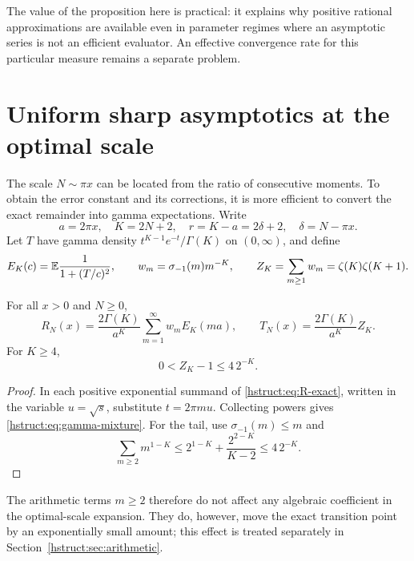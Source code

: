 The value of the proposition here is practical: it explains why
positive rational approximations are available even in parameter
regimes where an asymptotic series is not an efficient evaluator.
An effective convergence rate for this particular measure remains
a separate problem.

\section{Uniform sharp asymptotics at the optimal scale}
\label{hstruct:sec:sharp}

The scale $N\sim\pi x$ can be located from the ratio of consecutive
moments. To obtain the error constant and its corrections, it is
more efficient to convert the exact remainder into gamma expectations.
Write
\begin{equation}\label{hstruct:eq:gamma-notation}
 a=2\pi x,\quad K=2N+2,\quad r=K-a=2\delta+2,\quad
 \delta=N-\pi x.
\end{equation}
Let $T$ have gamma density $t^{K-1}e^{-t}/\Gamma(K)$ on $(0,\infty)$,
and define
\[
 E_K(c)=\mathbb E\frac1{1+(T/c)^2},\qquad
 w_m=\sigma_{-1}(m)m^{-K},\qquad
 Z_K=\sum_{m\ge1}w_m=\zeta(K)\zeta(K+1).
\]

\begin{lemma}\label{hstruct:lem:gamma-mixture}
For all $x>0$ and $N\ge0$,
\begin{equation}\label{hstruct:eq:gamma-mixture}
 R_N(x)=\frac{2\Gamma(K)}{a^K}\sum_{m=1}^\infty w_m E_K(ma),
 \qquad T_N(x)=\frac{2\Gamma(K)}{a^K}Z_K.
\end{equation}
For $K\ge4$,
\begin{equation}\label{hstruct:eq:frequency-tail}
 0<Z_K-1\le4\,2^{-K}.
\end{equation}
\end{lemma}
\begin{proof}
In each positive exponential summand of \eqref{hstruct:eq:R-exact}, written
in the variable $u=\sqrt s$, substitute $t=2\pi m u$. Collecting
powers gives \eqref{hstruct:eq:gamma-mixture}. For the tail, use
$\sigma_{-1}(m)\le m$ and
\[
 \sum_{m\ge2}m^{1-K}
 \le 2^{1-K}+\frac{2^{2-K}}{K-2}\le4\,2^{-K}.
\]
\end{proof}

The arithmetic terms $m\ge2$ therefore do not affect any algebraic
coefficient in the optimal-scale expansion. They do, however, move
the exact transition point by an exponentially small amount; this
effect is treated separately in Section~\ref{hstruct:sec:arithmetic}.

